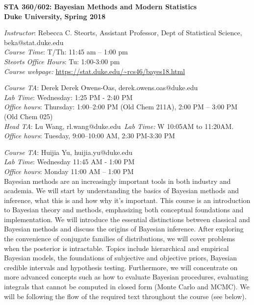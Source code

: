 \documentclass[11pt]{article}
\date{}
\begin{document}
\begin{center}
{\Large\bf STA 360/602: Bayesian Methods and Modern Statistics} \\

{\Large\bf Duke University, Spring 2018} \\
\end{center}

\emph{Instructor}: Rebecca C. Steorts,  Assistant Professor, Dept of Statistical Science, beka@stat.duke.edu\\
\emph{Course Time}: T/Th: 11:45 am -- 1:00 pm\\
\emph{Steorts Office Hours}: Tu: 1:00-3:00 pm \\
\emph{Course webpage:} \url{https://stat.duke.edu/~rcs46/bayes18.html} \\
\vspace*{1em}

\emph{Course TA}: Derek Derek Owens-Oas, derek.owens.oas@duke.edu \\
\emph{Lab Time}: Wednesday: 1:25 PM - 2:40 PM \\
\emph{Office hours}: Thursday: 1:00--2:00 PM (Old Chem 211A), 2:00 PM -- 3:00 PM (Old Chem 025)  \\

\emph{Head TA}:  Lu Wang, rl.wang@duke.edu\
\emph{Lab Time:} W 10:05AM to 11:20AM.\\
\emph{Office hours}: Tuesday, 9:00--10:00 AM, 2:30 PM-3:30 PM\\
\vspace*{1em}

\emph{Course TA}: Huijia Yu, huijia.yu@duke.edu \\
\emph{Lab Time}: Wednesday 11:45 AM - 1:00 PM\\
\emph{Office hours}: Monday 11:00 AM -- 1:00 PM \\


Bayesian methods are an increasingly important tools
in both industry and academia. We will start by understanding the basics of Bayesian methods and inference, what this is and how why it's important. 
This course is an introduction to Bayesian theory and methods, emphasizing both conceptual foundations and implementation. We will introduce the essential distinctions between classical and Bayesian methods and discuss the origins of Bayesian inference. After exploring the convenience of conjugate families of distributions, we will cover problems when the posterior is intractable. Topics include hierarchical and empirical Bayesian models, the foundations of subjective and objective priors, Bayesian credible intervals and hypothesis testing. Furthermore, we 
will  concentrate on more advanced concepts such as how to evaluate Bayesian procedures, evaluating integrals that cannot be computed in closed form (Monte Carlo and MCMC). We will be following the flow of the required text throughout the course (see below). \\
\end{document}
